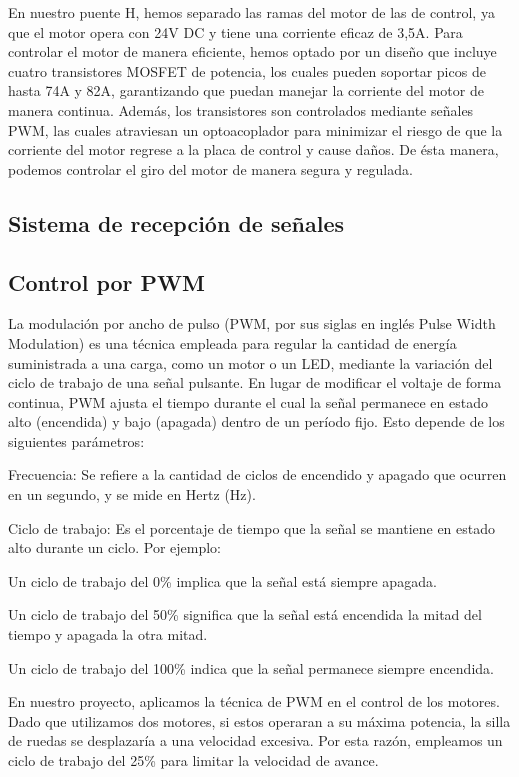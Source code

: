 \documentclass{article}
\begin{document}
En nuestro puente H, hemos separado las ramas del motor de las de control, ya que el motor opera con 24V DC y tiene una corriente eficaz de 3,5A. Para controlar el motor de manera eficiente, hemos optado por un diseño que incluye cuatro transistores MOSFET de potencia, los cuales pueden soportar picos de hasta 74A y 82A, garantizando que puedan manejar la corriente del motor de manera continua. Además, los transistores son controlados mediante señales PWM, las cuales atraviesan un optoacoplador para minimizar el riesgo de que la corriente del motor regrese a la placa de control y cause daños. De ésta manera, podemos controlar el giro del motor de manera segura y regulada.


\subsection{Sistema de recepción de señales}

\subsection{Control por PWM}
La modulación por ancho de pulso (PWM, por sus siglas en inglés Pulse Width Modulation) es una técnica empleada para regular la cantidad de energía suministrada a una carga, como un motor o un LED, mediante la variación del ciclo de trabajo de una señal pulsante. En lugar de modificar el voltaje de forma continua, PWM ajusta el tiempo durante el cual la señal permanece en estado alto (encendida) y bajo (apagada) dentro de un período fijo. Esto depende de los siguientes parámetros:


Frecuencia: Se refiere a la cantidad de ciclos de encendido y apagado que ocurren en un segundo, y se mide en Hertz (Hz).


Ciclo de trabajo: Es el porcentaje de tiempo que la señal se mantiene en estado alto durante un ciclo. Por ejemplo:

Un ciclo de trabajo del 0\% implica que la señal está siempre apagada.

Un ciclo de trabajo del 50\% significa que la señal está encendida la mitad del tiempo y apagada la otra mitad.

Un ciclo de trabajo del 100\% indica que la señal permanece siempre encendida.


En nuestro proyecto, aplicamos la técnica de PWM en el control de los motores. Dado que utilizamos dos motores, si estos operaran a su máxima potencia, la silla de ruedas se desplazaría a una velocidad excesiva. Por esta razón, empleamos un ciclo de trabajo del 25\% para limitar la velocidad de avance.
\end{document}
